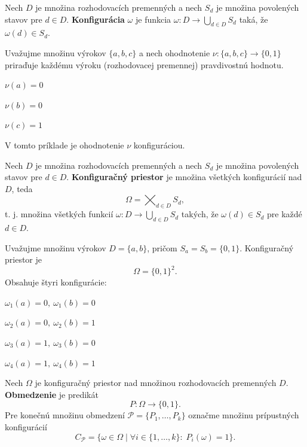 \begin{definition}
    Nech $D$ je množina rozhodovacích premenných a nech $S_d$ je množina povolených stavov pre $d \in D$. \textbf{Konfigurácia} $\omega$ je funkcia
    $\omega : D \xrightarrow{} \bigcup_{d \in D} S_d$ taká, že $\omega(d) \in S_d$.
\end{definition}

\begin{example}
    Uvažujme množinu výrokov $\{a,b,c\}$ a nech ohodnotenie $\nu : \{a,b,c\} \xrightarrow{} \{0,1\}$ priraďuje každému výroku (rozhodovacej premennej) pravdivostnú hodnotu.
    \begin{center}
        \item $\nu(a)=0$
        \item $\nu(b)=0$
        \item $\nu(c)=1$
    \end{center}
    V tomto príklade je ohodnotenie $\nu$ konfiguráciou.
\end{example}

\begin{definition}
    Nech $D$ je množina rozhodovacích premenných a nech $S_d$ je množina povolených stavov pre $d \in D$.
    \textbf{Konfiguračný priestor} je množina všetkých konfigurácií nad $D$, teda
    \[
        \Omega = \bigtimes _{d \in D} S_d,
    \]
    t. j. množina všetkých funkcií $\omega : D \xrightarrow{} \bigcup_{d \in D} S_d$ takých, že $\omega(d) \in S_d$ pre každé $d \in D$.
\end{definition}

\begin{example}
    Uvažujme množinu výrokov $D=\{a,b\}$, pričom $S_a=S_b=\{0,1\}$.
    Konfiguračný priestor je
    \[
        \Omega = \{0,1\}^2.
    \]
    Obsahuje štyri konfigurácie:
    \begin{center}
        \item $\omega_1(a)=0,\ \omega_1(b)=0$
        \item $\omega_2(a)=0,\ \omega_2(b)=1$
        \item $\omega_3(a)=1,\ \omega_3(b)=0$
        \item $\omega_4(a)=1,\ \omega_4(b)=1$
    \end{center}
\end{example}

\begin{definition}
    Nech $\Omega$ je konfiguračný priestor nad množinou rozhodovacích premenných $D$.
    \textbf{Obmedzenie} je predikát
    \[
        P : \Omega \xrightarrow{} \{0,1\}.
    \]
    Pre konečnú množinu obmedzení $\mathcal{P}=\{P_1,\dots,P_k\}$ označme množinu prípustných konfigurácií
    \[
        C_{\mathcal{P}} = \{\omega \in \Omega \mid \forall i \in \{1,\dots,k\}:\; P_i(\omega)=1\}.
    \]
\end{definition}

